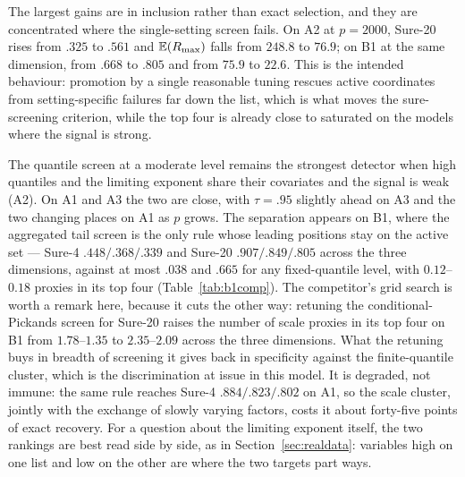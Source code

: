 The largest gains are in inclusion rather than exact selection, and
they are concentrated where the single-setting screen fails. On A2 at
$p=2000$, Sure-20 rises from $.325$ to $.561$ and $\mathbb E(R_{\max})$ falls
from $248.8$ to $76.9$; on B1 at the same dimension, from $.668$ to
$.805$ and from $75.9$ to $22.6$. This is the intended behaviour:
promotion by a single reasonable tuning rescues active coordinates from
setting-specific failures far down the list, which is what moves the
sure-screening criterion, while the top four is already close to
saturated on the models where the signal is strong.

The quantile screen at a moderate level remains the strongest detector
when high quantiles and the limiting exponent share their covariates
and the signal is weak (A2). On A1 and A3 the two are close, with
$\tau=.95$ slightly ahead on A3 and the two changing places on A1 as
$p$ grows. The separation appears on B1, where the aggregated tail
screen is the only rule whose leading positions stay on the active set
--- Sure-4 $.448/.368/.339$ and Sure-20 $.907/.849/.805$ across the
three dimensions, against at most $.038$ and $.665$ for any
fixed-quantile level, with $0.12$--$0.18$ proxies in its top four
(Table~\ref{tab:b1comp}). The competitor's grid search is worth a
remark here, because it cuts the other way: retuning the
conditional-Pickands screen for Sure-20 raises the number of scale
proxies in its top four on B1 from $1.78$--$1.35$ to $2.35$--$2.09$
across the three dimensions. What the retuning buys in breadth of
screening it gives back in specificity against the finite-quantile
cluster, which is the discrimination at issue in this model. It is
degraded, not
immune: the same rule reaches Sure-4 $.884/.823/.802$ on A1, so the
scale cluster, jointly with the exchange of slowly varying factors,
costs it about forty-five points of exact recovery. For a question
about the limiting exponent itself, the two rankings are best read
side by side, as in Section~\ref{sec:realdata}: variables high on one
list and low on the other are where the two targets part ways.
